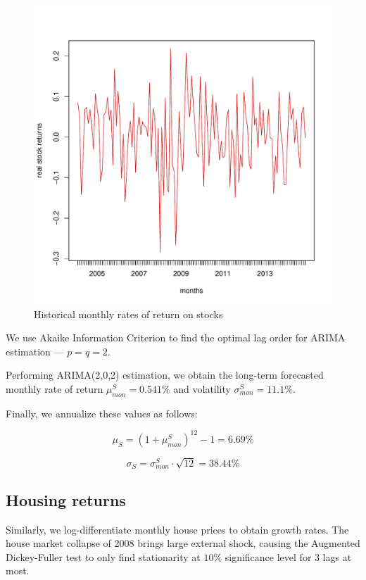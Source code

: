\documentclass[]{elsarticle}
\begin{document}
\begin{appendix}
\begin{figure}[h!]
	\centering
	\includegraphics[scale=0.3]{figs/bistdiff.pdf}
	\caption{Historical monthly rates of return on stocks}
	\label{fig:bistdiff}
\end{figure}

We use Akaike Information Criterion to find the optimal lag order for ARIMA estimation --- $p=q=2$.

Performing ARIMA(2,0,2) estimation, we obtain the long-term forecasted monthly rate of return $\mu^S_{mon} = 0.541\%$ and volatility $\sigma^S_{mon} = 11.1\%$.

Finally, we annualize these values as follows:

\begin{equation}
	\mu_S = (1 + \mu^S_{mon})^{12} - 1= 6.69\%
\end{equation}

\begin{equation}
	\sigma_S = \sigma^S_{mon} \cdot \sqrt{12} = 38.44\%
\end{equation}

\subsection{Housing returns}
\label{paramcaliby}
Similarly, we log-differentiate monthly house prices to obtain growth rates. The house market collapse of 2008 brings large external shock, causing the Augmented Dickey-Fuller test to only find stationarity at $10\%$ significance level for 3 lags at most.


\end{appendix}
\end{document}
